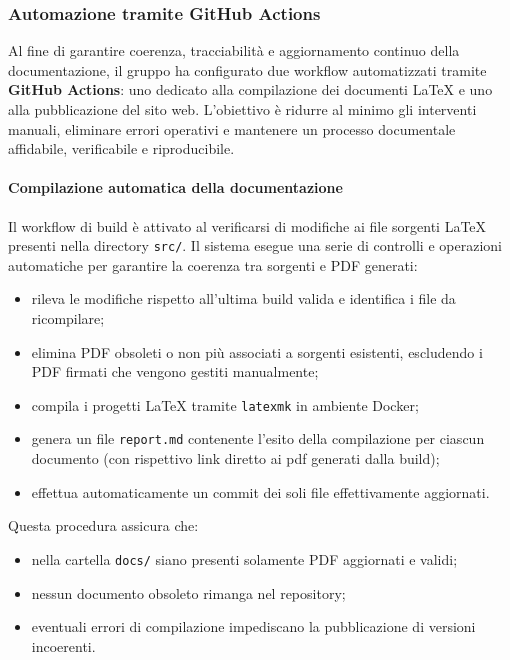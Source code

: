 \documentclass[a4paper, 11pt, oneside]{scrartcl} %
\begin{document}
\subsubsection{Automazione tramite GitHub Actions}

Al fine di garantire coerenza, tracciabilità e aggiornamento continuo della documentazione, il gruppo ha configurato due workflow{\scriptsize{}} automatizzati tramite \textbf{GitHub Actions}{\scriptsize{}}: uno dedicato alla compilazione dei documenti \LaTeX{} e uno alla pubblicazione del sito web.
L’obiettivo è ridurre al minimo gli interventi manuali, eliminare errori operativi e mantenere un processo documentale affidabile, verificabile e riproducibile.
\paragraph{Compilazione automatica della documentazione}

Il workflow di build è attivato al verificarsi di modifiche ai file sorgenti \LaTeX{} presenti nella directory \texttt{src/}.
Il sistema esegue una serie di controlli e operazioni automatiche per garantire la coerenza tra sorgenti e PDF generati:

\begin{itemize}
    \item rileva le modifiche rispetto all’ultima build valida e identifica i file da ricompilare;
\item elimina PDF obsoleti o non più associati a sorgenti esistenti, escludendo i PDF firmati che vengono gestiti manualmente;
\item compila i progetti \LaTeX{} tramite \texttt{latexmk} in ambiente Docker{\scriptsize{}};
\item genera un file \texttt{report.md} contenente l'esito della compilazione per ciascun documento (con rispettivo link diretto ai pdf generati dalla build);
\item effettua automaticamente un commit{\scriptsize{}} dei soli file effettivamente aggiornati.
\end{itemize}

Questa procedura assicura che:

\begin{itemize}
    \item nella cartella \texttt{docs/} siano presenti solamente PDF aggiornati e validi;
\item nessun documento obsoleto rimanga nel repository;
    \item eventuali errori di compilazione impediscano la pubblicazione di versioni incoerenti.
\end{itemize}
\end{document}
